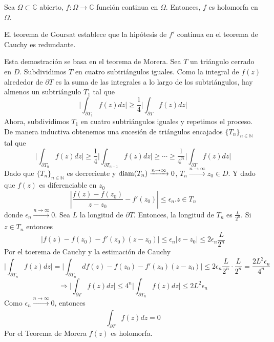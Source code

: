 \begin{theo}[Goursat]
  Sea $\Omega \subset \mathbb{C}$ abierto, $f: \Omega \to \mathbb{C}$ función continua en $\Omega$. Entonces, $f$ es holomorfa en $\Omega$.
\end{theo}

\begin{obs} 
  El teorema de Goursat establece que la hipótesis de $f'$ continua en el teorema de Cauchy es redundante.
\end{obs}

\begin{dem}
  Esta demostración se basa en el teorema de Morera. Sea $T$ un triángulo cerrado en $D$. Subdividimos $T$ en cuatro subtriángulos iguales. Como la integral de $f(z)$ alrededor de $\partial T$ es la suma de las integrales a lo largo de los subtriángulos, hay almenos un subtriángulo $T_{1}$ tal que
  \[ 
    \Bigg |  \int_{\partial{T_{1}}}^{} f(z) dz \Bigg | \geq \frac{1}{4} \Bigg | \int_{\partial{ T}}^{} f(z) dz \Bigg |
  \] 
  Ahora, subdividimos $T_{1}$ en cuatro subtriángulos iguales y repetimos el proceso. De manera inductiva obtenemos una sucesión de triángulos encajados $\{ T_{n} \}_{n \in \mathbb{N}}$ tal que
  \[ 
    \Bigg |  \int_{\partial{T_{n}}}^{} f(z) dz \Bigg | \geq \frac{1}{4} \Bigg | \int_{\partial{T_{n-1}}}^{} f(z) dz \Bigg | \geq \cdots \geq \frac{1}{4^{n}} \Bigg | \int_{\partial{T}}^{} f(z) dz \Bigg |
  \] 
  Dado que $\{ T_{n} \}_{n \in \mathbb{N}}$ es decreciente y $\operatorname{diam}(T_{n}) \xrightarrow[]{ n \rightarrow \infty } 0$, $T_{n} \xrightarrow[]{ n \rightarrow \infty } z_{0} \in D$. Y dado que $ f(z)$ es diferenciable en $z_{0}$
  \[ 
    | \frac{f(z) - f(z_{0})}{z - z_{0}} - f'(z_{0}) | \leq \epsilon_{n}. z \in T_{n} 
  \] 
  donde $\epsilon_{n} \xrightarrow[]{ n \rightarrow \infty } 0$. Sea $L$ la longitud de $\partial{ T}$. Entonces, la longitud de $T_{n}$ es $\frac{L}{2^{n}}$. Si $z \in T_{n}$ entonces
  \[ 
    | f(z) - f(z_{0}) - f'(z_{0})(z-z_{0}) | \leq \epsilon_{n} | z - z_{0} | \leq 2 \epsilon_{n} \frac{L}{2^n} 
  \] 
  Por el toerema de Cauchy y la estimación de Cauchy
  \[ 
    \Big | \int_{\partial{T_{n}}}^{} f(z) dz \Big | = \Big | \int_{\partial{T_{n}}}^{}  d f(z) - f(z_{0}) - f'(z_{0})(z-z_{0}) \Big | \leq 2 \epsilon_{n} \frac{L}{2^n} \cdot \frac{L}{2^{n}} = \frac{2L^{2} \epsilon_{n}}{4^{n}}
  \] 
  \[ 
    \Rightarrow \Big | \int_{\partial{T}}^{} f(z) dz \Big | \leq 4^{n} \Big | \int_{\partial{T_{n}}}^{} f(z) dz \Big |  \leq 2 L^{2} \epsilon_{n}
  \] 
  Como $\epsilon_{n} \xrightarrow[]{ n \rightarrow \infty } 0$, entonces
  \[ 
    \int_{\partial{T}}^{} f(z) dz = 0 
  \] 
  Por el Teorema de Morera $f(z)$ es holomorfa.
\end{dem}

